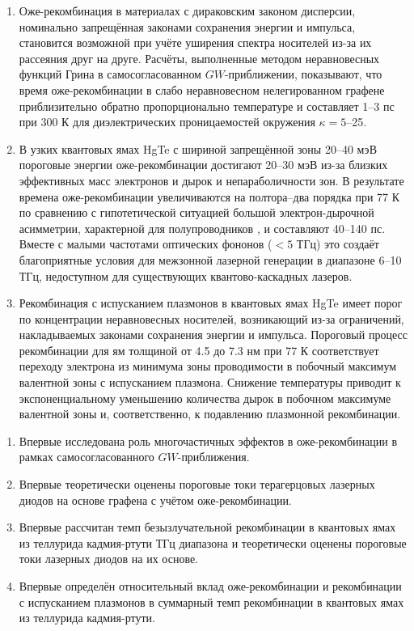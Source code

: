 \begin{enumerate}
\item Оже-рекомбинация в материалах с дираковским законом дисперсии, номинально запрещённая законами сохранения энергии и импульса, становится возможной при учёте уширения спектра носителей из-за их рассеяния друг на друге. Расчёты, выполненные методом неравновесных функций Грина в самосогласованном $GW$-приближении, показывают, что время оже-рекомбинации в слабо неравновесном нелегированном графене приблизительно обратно пропорционально температуре и составляет 1--3 пс при 300 К для диэлектрических проницаемостей окружения $\kappa = 5$--25.
\item В узких квантовых ямах HgTe с шириной запрещённой зоны 20--40 мэВ пороговые энергии оже-рекомбинации достигают 20--30 мэВ из-за близких эффективных масс электронов и дырок и непараболичности зон. В результате времена оже-рекомбинации увеличиваются на полтора--два порядка при 77 К по сравнению с гипотетической ситуацией большой электрон-дырочной асимметрии, характерной для полупроводников \AIIIBV{}, и составляют 40--140 пс. Вместе с малыми частотами оптических фононов ($< 5$ ТГц) это создаёт благоприятные условия для межзонной лазерной генерации в диапазоне 6--10 ТГц, недоступном для существующих квантово-каскадных лазеров.
\item Рекомбинация с испусканием плазмонов в квантовых ямах HgTe имеет порог по концентрации неравновесных носителей, возникающий из-за ограничений, накладываемых законами сохранения энергии и импульса. Пороговый процесс рекомбинации для ям толщиной от 4.5 до 7.3 нм при 77 К соответствует переходу электрона из минимума зоны проводимости в побочный максимум валентной зоны с испусканием плазмона. Снижение температуры приводит к экспоненциальному уменьшению количества дырок в побочном максимуме валентной зоны и, соответственно, к подавлению плазмонной рекомбинации.
\end{enumerate}

\novelty
\begin{enumerate}
  \item Впервые исследована роль многочастичных эффектов в оже-рекомбинации в рамках самосогласованного $GW$-приближения.
  \item Впервые теоретически оценены пороговые токи терагерцовых лазерных диодов на основе графена с учётом оже-рекомбинации.
  \item Впервые рассчитан темп безызлучательной рекомбинации в квантовых ямах из теллурида кадмия-ртути ТГц диапазона и теоретически оценены пороговые токи лазерных диодов на их основе.
  \item Впервые определён относительный вклад оже-рекомбинации и рекомбинации с испусканием плазмонов в суммарный темп рекомбинации в квантовых ямах из теллурида кадмия-ртути.
\end{enumerate}

